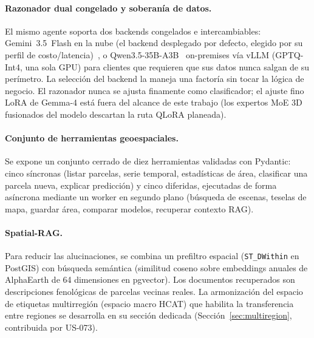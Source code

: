 \paragraph{Razonador dual congelado y soberanía de datos.}
El mismo agente soporta dos backends congelados e intercambiables:
Gemini~3.5~Flash en la nube (el backend desplegado por defecto, elegido
por su perfil de costo/latencia)~\cite{google2025gemini25}, o
Qwen3.5-35B-A3B~\cite{yang2025qwen3} on-premises vía vLLM
(GPTQ-Int4, una sola GPU) para clientes que requieren que sus datos
nunca salgan de su perímetro. La selección del backend la maneja una
factoría sin tocar la lógica de negocio. El razonador nunca se ajusta
finamente como clasificador; el ajuste fino LoRA de Gemma-4 está fuera
del alcance de este trabajo (los expertos MoE 3D fusionados del modelo
descartan la ruta QLoRA planeada).

\paragraph{Conjunto de herramientas geoespaciales.}
Se expone un conjunto cerrado de diez herramientas validadas con
Pydantic: cinco síncronas (listar parcelas, serie temporal, estadísticas
de área, clasificar una parcela nueva, explicar predicción) y cinco
diferidas, ejecutadas de forma asíncrona mediante un worker en segundo
plano (búsqueda de escenas, teselas de mapa, guardar área, comparar
modelos, recuperar contexto RAG).

\paragraph{Spatial-RAG.}
Para reducir las alucinaciones, se combina un prefiltro espacial
(\texttt{ST\_DWithin} en PostGIS) con búsqueda semántica (similitud
coseno sobre embeddings anuales de AlphaEarth de 64 dimensiones en
pgvector). Los documentos recuperados son descripciones fenológicas de
parcelas vecinas reales. La armonización del espacio de etiquetas
multirregión (espacio macro HCAT) que habilita la transferencia entre
regiones se desarrolla en su sección dedicada
(Sección~\ref{sec:multiregion}, contribuida por US-073).
